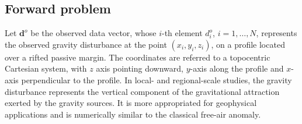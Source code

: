 \documentclass[manuscript]{geophysics}
\begin{document}
\subsection{Forward problem}


Let $\mathbf{d}^{o}$ be the observed data vector, whose $i$-th element $d^{o}_{i}$, 
$i = 1, \dots, N$, represents the observed gravity disturbance at the point 
$(x_{i}, y_{i}, z_{i})$, on a profile located over a rifted passive margin. The
coordinates are referred to a topocentric Cartesian system, with $z$ axis pointing
downward, $y$-axis along the profile and $x$-axis perpendicular to the profile. 
In local- and regional-scale studies, the gravity disturbance \citep{heiskanen-moritz1967} 
represents the vertical component of the gravitational attraction exerted by the gravity 
sources. It is more appropriated for geophysical applications 
\citep{li2001, fairhead2003, hackney-featherstone2003, hinze2005, vajda-etal2006, vajda-etal2007}
and is numerically similar to the classical free-air anomaly.
\end{document}
